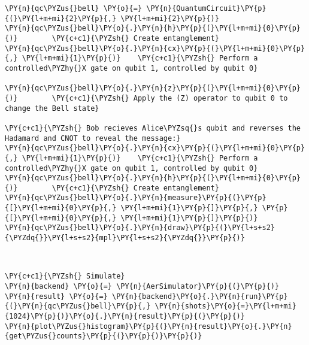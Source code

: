    \begin{tcolorbox}[breakable, size=fbox, boxrule=1pt, pad at break*=1mm,colback=cellbackground, colframe=cellborder]
\begin{Verbatim}[commandchars=\\\{\}]
\PY{n}{qc\PYZus{}bell} \PY{o}{=} \PY{n}{QuantumCircuit}\PY{p}{(}\PY{l+m+mi}{2}\PY{p}{,} \PY{l+m+mi}{2}\PY{p}{)}
\PY{n}{qc\PYZus{}bell}\PY{o}{.}\PY{n}{h}\PY{p}{(}\PY{l+m+mi}{0}\PY{p}{)}        \PY{c+c1}{\PYZsh{} Create entanglement}
\PY{n}{qc\PYZus{}bell}\PY{o}{.}\PY{n}{cx}\PY{p}{(}\PY{l+m+mi}{0}\PY{p}{,} \PY{l+m+mi}{1}\PY{p}{)}    \PY{c+c1}{\PYZsh{} Perform a controlled\PYZhy{}X gate on qubit 1, controlled by qubit 0}

\PY{n}{qc\PYZus{}bell}\PY{o}{.}\PY{n}{z}\PY{p}{(}\PY{l+m+mi}{0}\PY{p}{)}        \PY{c+c1}{\PYZsh{} Apply the (Z) operator to qubit 0 to change the Bell state}

\PY{c+c1}{\PYZsh{} Bob recieves Alice\PYZsq{}s qubit and reverses the Hadamard and CNOT to reveal the message:}
\PY{n}{qc\PYZus{}bell}\PY{o}{.}\PY{n}{cx}\PY{p}{(}\PY{l+m+mi}{0}\PY{p}{,} \PY{l+m+mi}{1}\PY{p}{)}    \PY{c+c1}{\PYZsh{} Perform a controlled\PYZhy{}X gate on qubit 1, controlled by qubit 0}
\PY{n}{qc\PYZus{}bell}\PY{o}{.}\PY{n}{h}\PY{p}{(}\PY{l+m+mi}{0}\PY{p}{)}        \PY{c+c1}{\PYZsh{} Create entanglement}
\PY{n}{qc\PYZus{}bell}\PY{o}{.}\PY{n}{measure}\PY{p}{(}\PY{p}{[}\PY{l+m+mi}{0}\PY{p}{,} \PY{l+m+mi}{1}\PY{p}{]}\PY{p}{,} \PY{p}{[}\PY{l+m+mi}{0}\PY{p}{,} \PY{l+m+mi}{1}\PY{p}{]}\PY{p}{)}
\PY{n}{qc\PYZus{}bell}\PY{o}{.}\PY{n}{draw}\PY{p}{(}\PY{l+s+s2}{\PYZdq{}}\PY{l+s+s2}{mpl}\PY{l+s+s2}{\PYZdq{}}\PY{p}{)}
\end{Verbatim}
\end{tcolorbox}
 
            
    
    \begin{center}
    \end{center}
    { \hspace*{\fill} \\}
    

    \begin{tcolorbox}[breakable, size=fbox, boxrule=1pt, pad at break*=1mm,colback=cellbackground, colframe=cellborder]
\begin{Verbatim}[commandchars=\\\{\}]
\PY{c+c1}{\PYZsh{} Simulate}
\PY{n}{backend} \PY{o}{=} \PY{n}{AerSimulator}\PY{p}{(}\PY{p}{)}
\PY{n}{result} \PY{o}{=} \PY{n}{backend}\PY{o}{.}\PY{n}{run}\PY{p}{(}\PY{n}{qc\PYZus{}bell}\PY{p}{,} \PY{n}{shots}\PY{o}{=}\PY{l+m+mi}{1024}\PY{p}{)}\PY{o}{.}\PY{n}{result}\PY{p}{(}\PY{p}{)}
\PY{n}{plot\PYZus{}histogram}\PY{p}{(}\PY{n}{result}\PY{o}{.}\PY{n}{get\PYZus{}counts}\PY{p}{(}\PY{p}{)}\PY{p}{)}
\end{Verbatim}
\end{tcolorbox}
 
